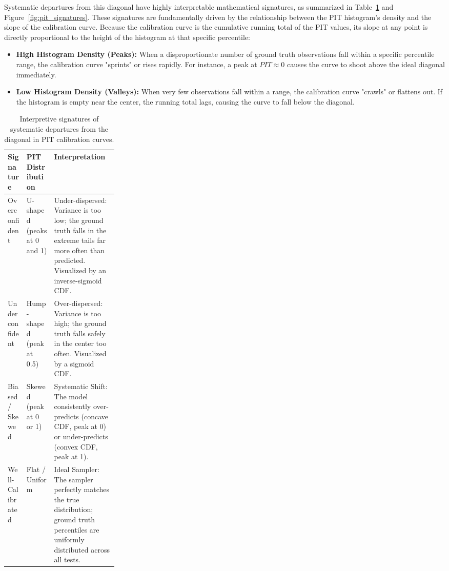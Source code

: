 Systematic departures from this diagonal have highly interpretable mathematical signatures, as summarized in Table~\ref{tab:pit_signatures} and Figure~\ref{fig:pit_signatures}. These signatures are fundamentally driven by the relationship between the PIT histogram's density and the slope of the calibration curve. Because the calibration curve is the cumulative running total of the PIT values, its slope at any point is directly proportional to the height of the histogram at that specific percentile:

\begin{itemize}
    \item \textbf{High Histogram Density (Peaks):} When a disproportionate number of ground truth observations fall within a specific percentile range, the calibration curve "sprints" or rises rapidly. For instance, a peak at $PIT \approx 0$ causes the curve to shoot above the ideal diagonal immediately.
    \item \textbf{Low Histogram Density (Valleys):} When very few observations fall within a range, the calibration curve "crawls" or flattens out. If the histogram is empty near the center, the running total lags, causing the curve to fall below the diagonal.
\end{itemize}

\begin{table}[!htbp]
\centering
\small
\setlength{\heavyrulewidth}{0.12em} 
\setlength{\lightrulewidth}{0.05em}
\renewcommand{\arraystretch}{1.6}

\begin{tabularx}{\linewidth}{@{} l >{\raggedright\arraybackslash}p{0.25\linewidth} X @{}}
\toprule
\textbf{Signature} & \textbf{PIT Distribution} & \textbf{Interpretation} \\
\midrule
Overconfident & U-shaped (peaks at 0 and 1) & Under-dispersed: Variance is too low; the ground truth falls in the extreme tails far more often than predicted. Visualized by an inverse-sigmoid CDF. \\

Underconfident & Hump-shaped (peak at 0.5) & Over-dispersed: Variance is too high; the ground truth falls safely in the center too often. Visualized by a sigmoid CDF. \\

Biased / Skewed & Skewed (peak at 0 or 1) & Systematic Shift: The model consistently over-predicts (concave CDF, peak at 0) or under-predicts (convex CDF, peak at 1). \\

Well-Calibrated & Flat / Uniform & Ideal Sampler: The sampler perfectly matches the true distribution; ground truth percentiles are uniformly distributed across all tests. \\
\bottomrule
\end{tabularx}
\caption{Interpretive signatures of systematic departures from the diagonal in PIT calibration curves.}
\label{tab:pit_signatures}
\end{table}


